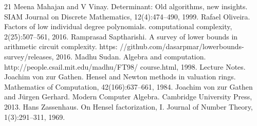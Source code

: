 \documentclass[10pt,a4paper]{article}
\begin{document}
\begin{thebibliography}{21}
Meena Mahajan and V Vinay. Determinant: Old algorithms, new insights. SIAM Journal on Discrete Mathematics, 12(4):474–490, 1999.
Rafael Oliveira. Factors of low individual degree polynomials. computational complexity, 2(25):507–561, 2016.
Ramprasad Saptharishi. A survey of lower bounds in arithmetic circuit complexity. https: //github.com/dasarpmar/lowerbounds-survey/releases, 2016.
Madhu Sudan. Algebra and computation. http://people.csail.mit.edu/madhu/FT98/ course.html, 1998. Lecture Notes.
Joachim von zur Gathen. Hensel and Newton methods in valuation rings. Mathematics of Computation, 42(166):637–661, 1984.
Joachim von zur Gathen and Jürgen Gerhard. Modern Computer Algebra. Cambridge University Press, 2013.
Hans Zassenhaus. On Hensel factorization, I. Journal of Number Theory, 1(3):291–311, 1969.
\end{thebibliography}
\end{document}
